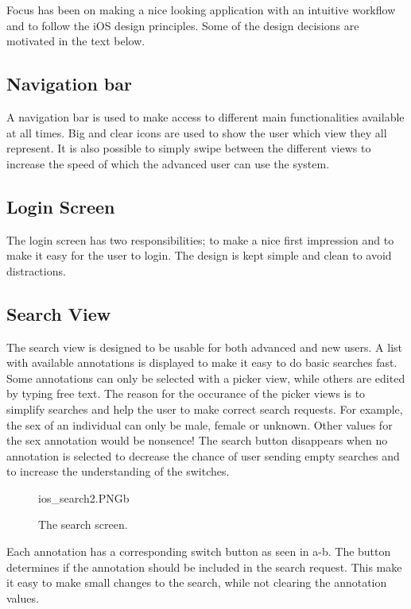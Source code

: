 Focus has been on making a nice looking application with an intuitive workflow and to follow the iOS design principles. Some of the design decisions are motivated in the text below.

\subsection{Navigation bar}
A navigation bar is used to make access to different main functionalities available at all times. Big and clear icons are used to show the user which view they all represent. It is also possible to simply swipe between the different views to increase the speed of which the advanced user can use the system.

\subsection{Login Screen}
The login screen has two responsibilities; to make a nice first impression and to make it easy for the user to login. The design is kept simple and clean to avoid distractions.

\subsection{Search View}
The search view is designed to be usable for both advanced and new users. A list with available annotations is displayed to make it easy to do basic searches fast. Some annotations can only be selected with a picker view, while others are edited by typing free text. The reason for the occurance of the picker views is to simplify searches and help the user to make correct search requests. For example, the sex of an individual can only be male, female or unknown. Other values for the sex annotation would be nonsence! The search button disappears when no annotation is selected to decrease the chance of user sending empty searches and to increase the understanding of the switches. 

\begin{figure}[ht]
		{ios_search2.PNG}{b}
\caption{The search screen.}
\label{fig:ios_search2}
\end{figure}
\FloatBarrier

Each annotation has a corresponding switch button as seen in a-b. The button determines if the annotation should be included in the search request. This make it easy to make small changes to the search, while not clearing the annotation values.


